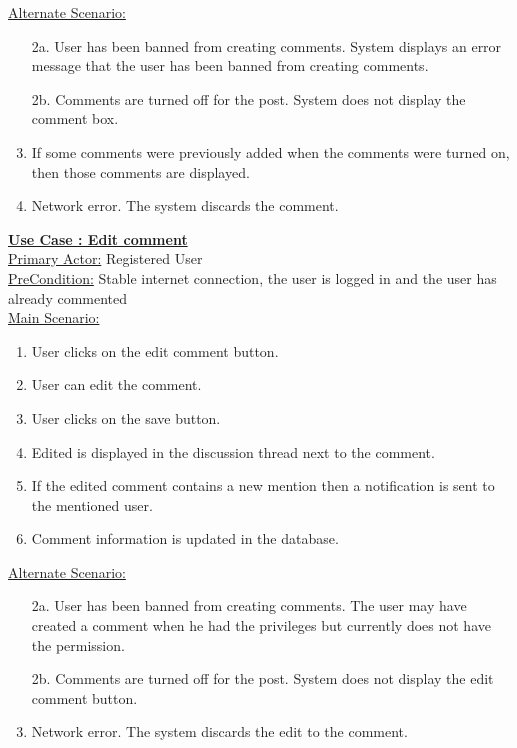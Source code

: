 \documentclass[conference,compsoc]{IEEEtran}
\newcounter{UC}
\newcommand{\nextU}{\stepcounter{UC}\theUC}
\begin{document}
\underline{Alternate Scenario:}\\
\begin{enumerate}
    \item [2a.] User has been banned from creating comments. System displays an error message that the user has been banned from creating comments.
    \item [2b.] Comments are turned off for the post. System does not display the comment box.
    \item If some comments were previously added when the comments were turned on, then those comments are displayed.
    \item Network error. The system discards the comment.
\end{enumerate}\vspace{0.2cm}

\underline{\textbf{Use Case \nextU: Edit comment}}\\

\underline{Primary Actor:} Registered User\\

\underline{PreCondition:} Stable internet connection, the user is logged in and the user has already commented\\

\underline{Main Scenario:}\\
\begin{enumerate}
    \item User clicks on the edit comment button.
    \item User can edit the comment.
    \item User clicks on the save button.
    \item Edited is displayed in the discussion thread next to the comment.
    \item If the edited comment contains a new mention then a notification is sent to the mentioned user.
    \item Comment information is updated in the database.
\end{enumerate}

\underline{Alternate Scenario:}\\
\begin{enumerate}
    \item [2a.] User has been banned from creating comments. The user may have created a comment when he had the privileges but currently does not have the permission.
    \item [2b.] Comments are turned off for the post. System does not display the edit comment button.
    \item Network error. The system discards the edit to the comment.
\end{enumerate}
\end{document}
